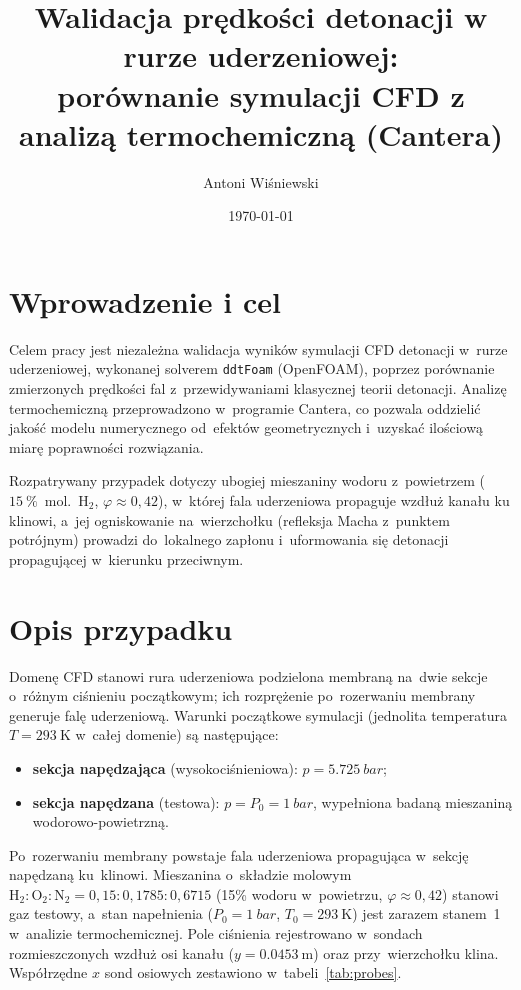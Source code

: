 \documentclass[11pt,a4paper]{article}
\title{\vspace{-1.5em}Walidacja prędkości detonacji w rurze uderzeniowej:\\
porównanie symulacji CFD z analizą termochemiczną (Cantera)}
\author{Antoni Wiśniewski}
\date{\today}
\begin{document}
\maketitle

\section{Wprowadzenie i cel}
Celem pracy jest niezależna walidacja wyników symulacji CFD detonacji
w~rurze uderzeniowej, wykonanej solverem \texttt{ddtFoam} (OpenFOAM), poprzez
porównanie zmierzonych prędkości fal z~przewidywaniami klasycznej teorii
detonacji. Analizę termochemiczną przeprowadzono w~programie Cantera, co
pozwala oddzielić jakość modelu numerycznego od~efektów geometrycznych
i~uzyskać ilościową miarę poprawności rozwiązania.

Rozpatrywany przypadek dotyczy ubogiej mieszaniny wodoru z~powietrzem
($\SI{15}{\percent}$~mol.~$\mathrm{H_2}$, $\varphi\approx0{,}42$), w~której
fala uderzeniowa propaguje wzdłuż kanału ku klinowi, a~jej ogniskowanie
na~wierzchołku (refleksja Macha z~punktem potrójnym) prowadzi do~lokalnego
zapłonu i~uformowania się detonacji propagującej w~kierunku przeciwnym.

\section{Opis przypadku}
Domenę CFD stanowi rura uderzeniowa podzielona membraną na~dwie sekcje
o~różnym ciśnieniu początkowym; ich rozprężenie po~rozerwaniu membrany
generuje falę uderzeniową. Warunki początkowe symulacji (jednolita
temperatura $T=\SI{293}{\kelvin}$ w~całej domenie) są następujące:
\begin{itemize}
\item \textbf{sekcja napędzająca} (wysokociśnieniowa): $p=\SI{5,725}{bar}$;
\item \textbf{sekcja napędzana} (testowa): $p=P_0=\SI{1}{bar}$,
wypełniona badaną mieszaniną wodorowo-powietrzną.
\end{itemize}
Po~rozerwaniu membrany powstaje fala uderzeniowa propagująca w~sekcję
napędzaną ku~klinowi. Mieszanina o~składzie molowym
$\mathrm{H_2}:\mathrm{O_2}:\mathrm{N_2}=0{,}15:0{,}1785:0{,}6715$
(15\% wodoru w~powietrzu, $\varphi\approx0{,}42$) stanowi gaz testowy,
a~stan napełnienia ($P_0=\SI{1}{bar}$, $T_0=\SI{293}{\kelvin}$) jest
zarazem stanem~1 w~analizie termochemicznej. Pole ciśnienia rejestrowano
w~sondach rozmieszczonych wzdłuż osi kanału ($y=\SI{0,0453}{\meter}$) oraz
przy~wierzchołku klina. Współrzędne $x$ sond osiowych zestawiono
w~tabeli~\ref{tab:probes}.
\end{document}
